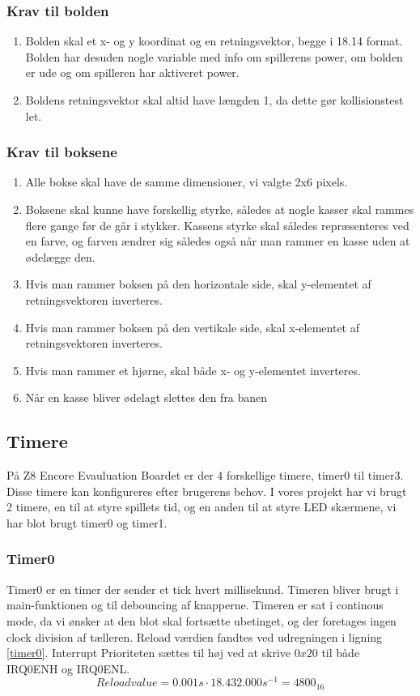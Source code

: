 \subsubsection{Krav til bolden}
\label{Ballkrav}
\begin{enumerate}
\item Bolden skal et x- og y koordinat og en retningsvektor, begge i 18.14 format. Bolden har desuden nogle variable med info om spillerens power, om bolden er ude og om spilleren har aktiveret power.
\item Boldens retningsvektor skal altid have længden 1, da dette gør kollisionstest let.
\end{enumerate}
\subsubsection{Krav til boksene}
\begin{enumerate}
\item Alle bokse skal have de samme dimensioner, vi valgte 2x6 pixels.
\item Boksene skal kunne have forskellig styrke, således at nogle kasser skal rammes flere gange før de går i stykker. Kassens styrke skal således repræsenteres ved en farve, og farven ændrer sig således også når man rammer en kasse uden at ødelægge den.
\item Hvis man rammer boksen på den horizontale side, skal y-elementet af retningsvektoren inverteres. 
\item Hvis man rammer boksen på den vertikale side, skal x-elementet af retningsvektoren inverteres.
\item Hvis man rammer et hjørne, skal både x- og y-elementet inverteres.
\item Når en kasse bliver ødelagt slettes den fra banen
\end{enumerate}


\subsection{Timere}
På Z8 Encore Evauluation Boardet er der 4 forskellige timere, timer0 til timer3. Disse timere kan konfigureres efter brugerens behov. I vores projekt har vi brugt 2 timere, en til at styre spillets tid, og en anden til at styre LED skærmene, vi har blot brugt timer0 og timer1.
\subsubsection{Timer0}
Timer0 er en timer der sender et tick hvert millisekund. Timeren bliver brugt i main-funktionen og til debouncing af knapperne. Timeren er sat i continous mode, da vi ønsker at den blot skal fortsætte ubetinget, og der foretages ingen clock division af tælleren. Reload værdien fandtes ved udregningen i ligning \ref{timer0}. Interrupt Prioriteten sættes til høj ved at skrive $0x20$ til både IRQ0ENH og IRQ0ENL.
\begin{equation}
\label{timer0}
Reloadvalue = 0.001 \si{s} \cdot 18.432.000 \si{s^{-1}} = 4800_{16} 
\end{equation}
